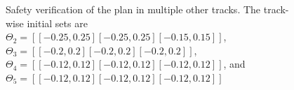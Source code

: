 \begin{figure}
    \caption{Safety verification of the plan in multiple other tracks. The track-wise initial sets are $\Theta_{2} = [[-0.25, 0.25][-0.25, 0.25][-0.15,0.15]]$, $\Theta_{3} = [[-0.2, 0.2][-0.2, 0.2][-0.2,0.2]]$, $\Theta_{4} = [[-0.12, 0.12][-0.12, 0.12][-0.12,0.12]]$, and $\Theta_{5} = [[-0.12, 0.12][-0.12, 0.12][-0.12,0.12]]$}
\label{fig:eval_track2-track3-track4-track5}
\end{figure}





